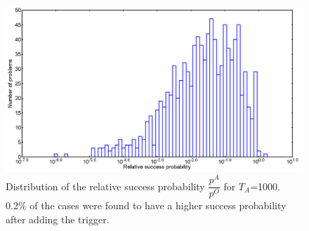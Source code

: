 \documentclass[../main.tex]{subfiles}
\begin{document}
\begin{figure}[H]
\centering 
\includegraphics[scale=0.24]{A_T1000_g0.png}
\caption{Distribution of the relative success probability $\dfrac{p^A}{p^O}$ for $T_A$=1000. 0.2\% of the cases were found to have a higher success probability after adding the trigger.}
\label{fig:a12}
\end{figure}
\end{document}
